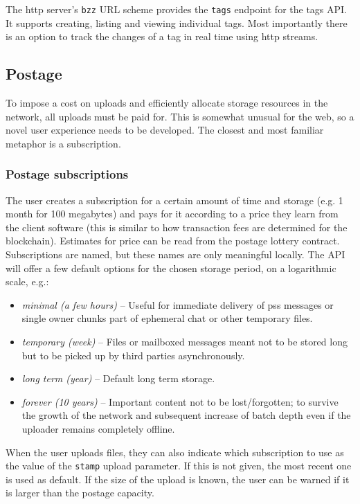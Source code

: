 The http server's \lstinline{bzz} URL scheme provides the \lstinline{tags} endpoint for the tags API. It supports creating, listing and viewing individual tags. Most importantly there is an option to track the changes of a tag in real time using http streams.



\subsection{Postage \statusgreen}\label{sec:postage-ux}

To impose a cost on uploads and efficiently allocate storage resources in the network, all uploads must be paid for.  This is somewhat unusual for the web, so a novel user experience needs to be developed. The closest and most familiar metaphor is a subscription.

\subsubsection{Postage subscriptions}

The user creates a subscription for a certain amount of time and storage (e.g. 1 month for 100 megabytes) and pays for it according to a price they learn from the client software (this is similar to how transaction fees are determined for the blockchain). Estimates for price can be read from the postage lottery contract. Subscriptions are named, but these names are only meaningful locally. The API will offer a few default options for the chosen storage period, on a logarithmic scale, e.g.: 

\begin{itemize}[noitemsep]
\item \emph{minimal (a few hours)} -- Useful for immediate delivery of pss messages or single owner chunks part of ephemeral chat or other temporary files.
\item \emph{temporary (week)} -- Files or mailboxed messages meant not to be stored long but to be picked up by third parties asynchronously.
\item \emph{long term (year)} -- Default long term storage. 
\item \emph{forever (10 years)} -- Important content not to be lost/forgotten; to survive the growth of the network and subsequent increase of batch depth even if the uploader remains completely offline.
\end{itemize}

When the user uploads files, they can also indicate which subscription to use as the value of the \lstinline{stamp} upload parameter. If this is not given, the most recent one is used as default. If the size of the upload is known, the user can be warned if it is larger than the postage capacity. 

